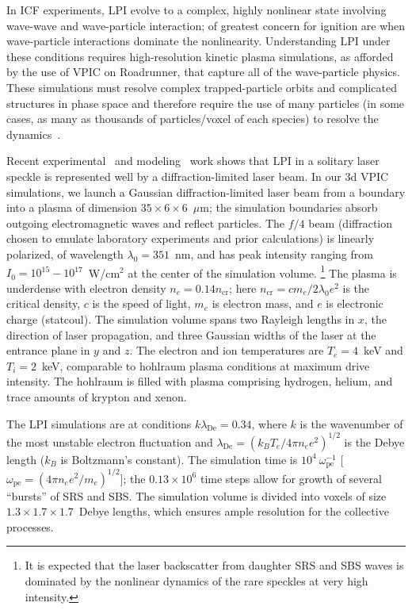 \documentclass[journal,twoside]{IEEEtran}
\newcommand{\lde}      {\lambda_{\mathrm{De}}}
\newcommand{\wpe}      {\omega_{\mathrm{pe}}}
\begin{document}
In ICF experiments, LPI evolve to a complex, highly nonlinear state
involving wave-wave and wave-particle interaction; of greatest concern
for ignition are when wave-particle interactions dominate the
nonlinearity.  Understanding LPI under these conditions requires
high-resolution kinetic plasma simulations, as afforded by the use of
VPIC on Roadrunner, that capture all of the wave-particle physics.
These simulations must resolve complex trapped-particle orbits and
complicated structures in phase space and therefore require the use of
many particles (in some cases, as many as thousands of particles/voxel
of each species) to resolve the
dynamics~\cite{Yin_et_al_Phys_Plasmas_2006}.

Recent experimental~\cite{Kline_PRL_2005} and
modeling~\cite{Yin_et_al_PRL_2007_SRS} work shows that LPI in a
solitary laser speckle is represented well by a diffraction-limited
laser beam.  In our 3d VPIC simulations, we launch a Gaussian
diffraction-limited laser beam from a boundary into a plasma of
dimension $35 \times 6 \times 6$~$\mu$m; the simulation boundaries
absorb outgoing electromagnetic waves and reflect particles.  The
$f/4$ beam (diffraction chosen to emulate laboratory experiments and
prior calculations) is linearly polarized, of wavelength $\lambda_0 =
351$~nm, and has peak intensity ranging from $I_0 = 10^{15} -
10^{17}$~W/cm$^2$ at the center of the simulation volume.
\footnote{It is expected that the laser backscatter from daughter SRS
and SBS waves is dominated by the nonlinear dynamics of the rare
speckles at very high intensity.}  The plasma is underdense with
electron density $n_e = 0.14 n_{\mathrm{cr}}$; here $n_{\mathrm{cr}} =
c m_e / 2 \lambda_0 e^2$ is the critical density, $c$ is the speed of
light, $m_e$ is electron mass, and $e$ is electronic charge
(statcoul).  The simulation volume spans two Rayleigh lengths in $x$,
the direction of laser propagation, and three Gaussian widths of the
laser at the entrance plane in $y$ and $z$.  The electron and ion
temperatures are $T_e = 4$~keV and $T_i = 2$~keV, comparable to
hohlraum plasma conditions at maximum drive intensity.  The hohlraum
is filled with plasma comprising hydrogen, helium, and trace amounts
of krypton and xenon.

The LPI simulations are at conditions $k \lde = 0.34$, where $k$ is
the wavenumber of the most unstable electron fluctuation and $\lde =
(k_B T_e / 4 \pi n_e e^2)^{1/2}$ is the Debye length ($k_B$ is
Boltzmann's constant).  The simulation time is $10^4~\wpe^{-1}$ [$\wpe
= (4 \pi n_e e^2 / m_e)^{1/2}$]; the $0.13 \times 10^6$ time steps
allow for growth of several ``bursts'' of SRS and SBS.  The simulation
volume is divided into voxels of size $1.3 \times 1.7 \times
1.7$~Debye lengths, which ensures ample resolution for the collective
processes.
\end{document}
